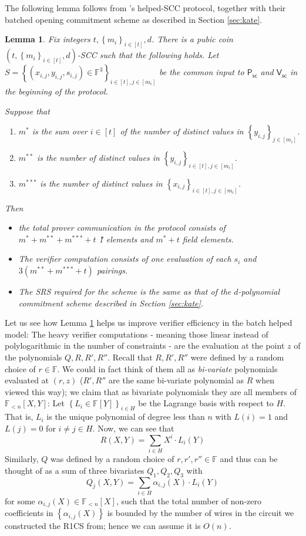 \documentclass[11pt]{article}
\numberwithin{figure}{section} %
\newtheorem{lemma}[thm]{Lemma}
\newcommand{\summ}{\ensuremath{\sum_{i\in H}}\xspace}
\newcommand{\set}[1]{\ensuremath{\left\{#1\right\}}\xspace}
\newcommand{\F}{\ensuremath{\mathbb F}\xspace}
\newcommand{\sett}[2]{\ensuremath{\set{#1}_{#2}}\xspace}
\newcommand{\polysofdeg}[1]{\ensuremath{\F_{< #1}[X]}\xspace}
\newcommand{\bivar}[1]{\ensuremath{\F_{< #1}[X,Y]}\xspace}
\newcommand{\sigprv}{\ensuremath{\mathsf{P_{sc}}}\xspace}
\newcommand{\sigver}{\ensuremath{\mathsf{V_{sc}}}\xspace}
\begin{document}
The following lemma follows from \cite{sonic}'s helped-SCC protocol, together with their batched opening commitment scheme as described in Section \ref{sec:kate}.
\begin{lemma}\label{lem:sonicSCC}
 Fix integers $t,\sett{m_i}{i\in [t]},d$.
 There is a pubic coin $(t,\sett{m_i}{i\in [t]},d)$-SCC such that the following holds.
 Let $S=\sett{(x_{i,j},y_{i,j},s_{i,j})\in \F^3}{i\in [t],j\in [m_i]}$ be the common input to \sigprv and \sigver in the beginning of the protocol.
 
 Suppose that 
 \begin{enumerate}
  \item $m^*$ is the sum over $i\in [t]$ of the number of distinct values in \sett{y_{i,j}}{j\in [m_i]}.
  \item $m^{**}$ is the number of distinct values in \sett{y_{i,j}}{i\in [t],j \in [m_i]}.
  \item $m^{***}$ is the number of distinct values in \sett{x_{i,j}}{i\in [t],j \in [m_i]}.
 \end{enumerate}
Then
 \begin{itemize}
  \item the total prover communication in the protocol consists of $m^* + m^{**}+m^{***} + t$ \G1 elements and $m^*+t$ field elements. 
  \item The verifier computation consists of one evaluation of each $s_i$ and $3(m^{**} +m^{***}+t)$ pairings.
\item The SRS required for the scheme is the same as that of the $d$-polynomial commitment scheme described in Section \ref{sec:kate}.
  \end{itemize}

\end{lemma}


Let us see how Lemma \ref{lem:sonicSCC} helps us improve verifier efficiency in the batch helped model:
The heavy verifier computations - meaning those linear instead of polylogarithmic in the number of constraints - are the evaluation at the point $z$ of the polynomials $Q,R,R',R''$.
Recall that $R,R',R''$ were defined by a random choice of $r\in \F$.
We could in fact think of them all as \emph{bi-variate} polynomials evaluated at $(r,z)$ ($R',R''$ are the same bi-variate polynomial as $R$ when viewed this way); we claim that as bivariate polynomials they are all members of \bivar{n}:
Let \sett{L_i \in \F[Y]}{i\in H} be the Lagrange basis with respect to $H$.
That is, $L_i$ is the unique polynomial of degree less than $n$ with 
$L(i)=1$ and $L(j)=0$ for $i\neq j \in H$.
Now, we can see that 
\[R(X,Y)=\summ X^i\cdot L_i(Y)\]
Similarly, $Q$ was defined by a random choice of $r,r',r''\in \F$ and thus can be thought of as a sum of three bivariates $Q_1,Q_2,Q_3$
with
\[Q_j(X,Y) = \summ \alpha_{i,j}(X)\cdot L_i(Y)\]
for some $\alpha_{i,j}(X)\in \polysofdeg{n}$, such that the total number of non-zero coefficients in \set{\alpha_{i,j}(X)} is bounded by the number of wires in the circuit we constructed the R1CS from; hence we can assume it is $O(n)$.
\end{document}
